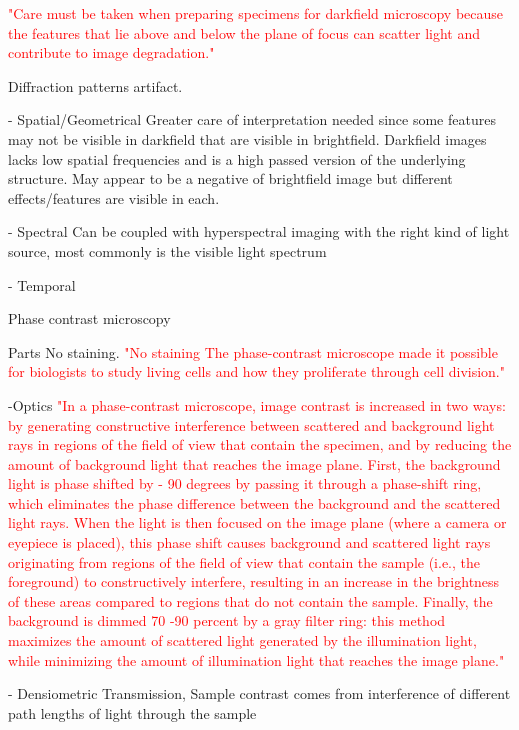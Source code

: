 	\textcolor{red}{"Care must be taken when preparing specimens for darkfield microscopy because the features that lie above and below the plane of focus can scatter light and contribute to image degradation."} 

	Diffraction patterns artifact. 


	- Spatial/Geometrical 
	Greater care of interpretation needed since some features may not be visible in darkfield that are visible in brightfield. Darkfield images lacks low spatial frequencies and is a high passed version of the underlying structure. May appear to be a negative of brightfield image but different effects/features are visible in each. 

	- Spectral
	Can be coupled with hyperspectral imaging with the right kind of light source, most commonly is the visible light spectrum

	- Temporal




Phase contrast microscopy

	Parts 
	No staining. \textcolor{red}{"No staining The phase-contrast microscope made it possible for biologists to study living cells and how they proliferate through cell division."}

	-Optics
	\textcolor{red}{"In a phase-contrast microscope, image contrast is increased in two ways: by generating constructive interference between scattered and background light rays in regions of the field of view that contain the specimen, and by reducing the amount of background light that reaches the image plane. First, the background light is phase shifted by - 90 degrees by passing it through a phase-shift ring, which eliminates the phase difference between the background and the scattered light rays. When the light is then focused on the image plane (where a camera or eyepiece is placed), this phase shift causes background and scattered light rays originating from regions of the field of view that contain the sample (i.e., the foreground) to constructively interfere, resulting in an increase in the brightness of these areas compared to regions that do not contain the sample. Finally, the background is dimmed 70 -90 percent by a gray filter ring: this method maximizes the amount of scattered light generated by the illumination light, while minimizing the amount of illumination light that reaches the image plane."} 

	- Densiometric
	Transmission, Sample contrast comes from interference of different path lengths of light through the sample 

